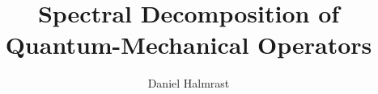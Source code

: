 \documentclass[12pt]{article}
\author{Daniel Halmrast}
\title{Spectral Decomposition of Quantum-Mechanical Operators}
\theoremstyle{definition}
\numberwithin{theorem}{subsection}
\numberwithin{example}{subsection}
\numberwithin{definition}{subsection}
\begin{document}
\maketitle











{}

\end{document}
